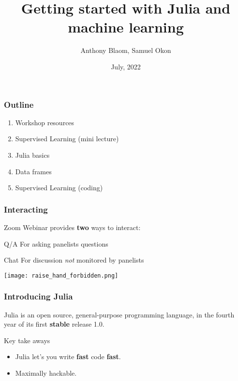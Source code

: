 \documentclass[t]{beamer}
\title{\color{Maroon} Getting started with Julia and machine learning}
\date{July, 2022}
\author{Anthony Blaom, Samuel Okon}
\newcommand\df{\bf\color{Maroon}}
\begin{document}



\begin{frame}
        \titlepage
\end{frame}

\begin{frame}
  \frametitle{Outline}
  \begin{enumerate}
  \item Workshop resources
  \item Supervised Learning (mini lecture)
  \item Julia basics 
  \item Data frames 
  \item Supervised Learning (coding)
  \end{enumerate}
\end{frame}

\begin{frame}
  \frametitle{Interacting}
   Zoom Webinar provides {\bf two} ways to interact:
  
  \begin{block}{Q/A}
    For asking panelists questions
  \end{block}

  \begin{block}{Chat}
    For discussion {\em not} monitored by panelists
  \end{block}\pause

  \begin{block}{\texttt{[image: raise\_hand\_forbidden.png]}}
  \end{block}

\end{frame}

\begin{frame}
  \frametitle{Introducing Julia}
  Julia is an open source, general-purpose programming language, in
  the fourth year of its first {\df stable} release 1.0.\pause

  \begin{block}{Key take aways}
    \begin{itemize}
    \item Julia let's you write {\df fast}
      code {\df fast}.\pause
    \item Maximally hackable.
  \end{itemize}
  \end{block}
\end{frame}
\end{document}

